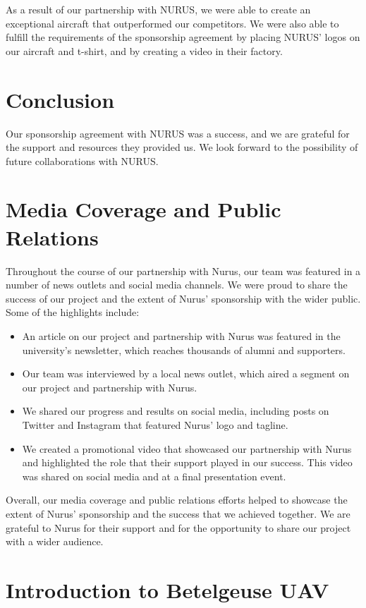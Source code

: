 \documentclass{article}
\begin{document}
As a result of our partnership with NURUS, we were able to create an exceptional aircraft that outperformed our competitors. We were also able to fulfill the requirements of the sponsorship agreement by placing NURUS' logos on our aircraft and t-shirt, and by creating a video in their factory.


\section{Conclusion}

Our sponsorship agreement with NURUS was a success, and we are grateful for the support and resources they provided us. We look forward to the possibility of future collaborations with NURUS.

\section{Media Coverage and Public Relations}

Throughout the course of our partnership with Nurus, our team was featured in a number of news outlets and social media channels. We were proud to share the success of our project and the extent of Nurus' sponsorship with the wider public. Some of the highlights include:

\begin{itemize}
\item An article on our project and partnership with Nurus was featured in the university's newsletter, which reaches thousands of alumni and supporters.
\item Our team was interviewed by a local news outlet, which aired a segment on our project and partnership with Nurus.
\item We shared our progress and results on social media, including posts on Twitter and Instagram that featured Nurus' logo and tagline.
\item We created a promotional video that showcased our partnership with Nurus and highlighted the role that their support played in our success. This video was shared on social media and at a final presentation event.
\end{itemize}

Overall, our media coverage and public relations efforts helped to showcase the extent of Nurus' sponsorship and the success that we achieved together. We are grateful to Nurus for their support and for the opportunity to share our project with a wider audience.

\section{Introduction to Betelgeuse UAV}
\end{document}
